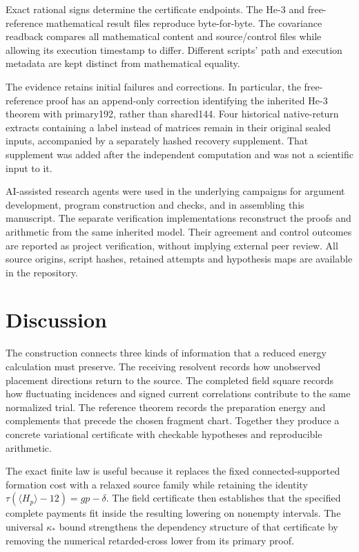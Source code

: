 \documentclass[11pt]{article}
\theoremstyle{definition}
\begin{document}
Exact rational signs determine the certificate endpoints. The He-3 and free-reference mathematical result files reproduce byte-for-byte. The covariance readback compares all mathematical content and source/control files while allowing its execution timestamp to differ. Different scripts' path and execution metadata are kept distinct from mathematical equality.

The evidence retains initial failures and corrections. In particular, the free-reference proof has an append-only correction identifying the inherited He-3 theorem with primary192, rather than shared144. Four historical native-return extracts containing a label instead of matrices remain in their original sealed inputs, accompanied by a separately hashed recovery supplement. That supplement was added after the independent computation and was not a scientific input to it.

AI-assisted research agents were used in the underlying campaigns for argument development, program construction and checks, and in assembling this manuscript. The separate verification implementations reconstruct the proofs and arithmetic from the same inherited model. Their agreement and control outcomes are reported as project verification, without implying external peer review. All source origins, script hashes, retained attempts and hypothesis maps are available in the repository.

\section{Discussion}

The construction connects three kinds of information that a reduced energy calculation must preserve. The receiving resolvent records how unobserved placement directions return to the source. The completed field square records how fluctuating incidences and signed current correlations contribute to the same normalized trial. The reference theorem records the preparation energy and complements that precede the chosen fragment chart. Together they produce a concrete variational certificate with checkable hypotheses and reproducible arithmetic.

The exact finite law is useful because it replaces the fixed connected-supported formation cost with a relaxed source family while retaining the identity $\tau(\langle H_p\rangle-12)=gp-\delta$. The field certificate then establishes that the specified complete payments fit inside the resulting lowering on nonempty intervals. The universal $\kappa_*$ bound strengthens the dependency structure of that certificate by removing the numerical retarded-cross lower from its primary proof.
\end{document}
